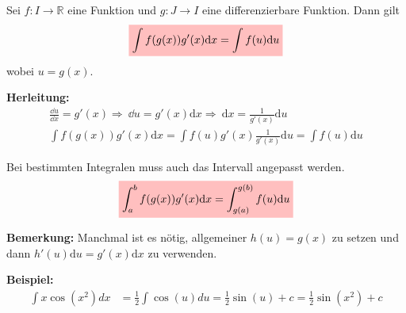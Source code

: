 \documentclass[12pt]{article}
\newcommand{\dx}{\mathrm{d}x}
\newcommand{\du}{\mathrm{d}u}
\newcommand{\Follows}{\Longrightarrow\ }
\newcommand{\R}{\mathbb{R}} %
\newenvironment{definition}[2][Definition]{\begin{trivlist}
        \item[\hskip \labelsep {\bfseries #1}\hskip \labelsep {\bfseries #2.}]}{\flushright{$\square$}\end{trivlist}}
\begin{document}
\begin{definition}{[Substitution]}
    Sei $f: I \to \R$ eine Funktion und $g: J \to I$ eine differenzierbare Funktion. Dann gilt
    \begin{align}
        \colorbox{pink}{\mathstrut$\displaystyle\int f(g(x))g'(x)\dx=\displaystyle\int f(u)\du$}
    \end{align}
    wobei $u=g(x)$.

    \textbf{Herleitung:}
    \begin{align*}
        \frac{\dd{u}}{\dd{x}}=g'(x) \Follows \dd{u}=g'(x)\dx \Follows \dx=\frac{1}{g'(x)}\du \\
        \int f(g(x))g'(x)\dx=\int f(u)g'(x)\frac{1}{g'(x)}\du=\int f(u)\du
    \end{align*}

    Bei bestimmten Integralen muss auch das Intervall angepasst werden.
    \begin{align}
        \colorbox{pink}{\mathstrut$\displaystyle\int_{a}^{b}f(g(x))g'(x)\dx=\displaystyle\int_{g(a)}^{g(b)}f(u)\du$}
    \end{align}

    \textbf{Bemerkung:} Manchmal ist es nötig, allgemeiner $h(u)=g(x)$ zu setzen und dann $h'(u)\du=g'(x)\dx$ zu verwenden.

    \textbf{Beispiel:}
    \begin{align*}
        \displaystyle\int x\cos(x^2)dx & =\frac{1}{2}\displaystyle\int \cos(u)du=\frac{1}{2}\sin(u)+c=\frac{1}{2}\sin(x^2)+c
    \end{align*}
\end{definition}
\end{document}
